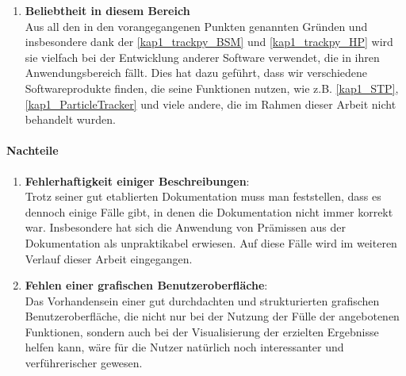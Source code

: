 \begin{enumerate}
    			\item \textbf{Beliebtheit in diesem Bereich}\\
    			Aus all den in den vorangegangenen Punkten genannten Gründen und insbesondere dank der \ref{kap1_trackpy_BSM} und \ref{kap1_trackpy_HP} wird sie vielfach bei der Entwicklung anderer Software verwendet, die in ihren Anwendungsbereich fällt. Dies hat dazu geführt, dass wir verschiedene Softwareprodukte finden, die seine Funktionen nutzen, wie z.B. \ref{kap1_STP}, \ref{kap1_ParticleTracker} und viele andere, die im Rahmen dieser Arbeit nicht behandelt wurden.
    			
		\end{enumerate}
		
	\paragraph{Nachteile}
		\begin{enumerate}
				\item \textbf{Fehlerhaftigkeit einiger Beschreibungen}:\\				
				Trotz seiner gut etablierten Dokumentation muss man feststellen, dass es dennoch einige Fälle gibt, in denen die Dokumentation nicht immer korrekt war. Insbesondere hat sich die Anwendung von Prämissen aus der Dokumentation als unpraktikabel erwiesen. Auf diese Fälle wird im weiteren Verlauf dieser Arbeit eingegangen.
				    			
    			\item \textbf{Fehlen einer grafischen Benutzeroberfläche}:\\
    			Das Vorhandensein einer gut durchdachten und strukturierten grafischen Benutzeroberfläche, die nicht nur bei der Nutzung der Fülle der angebotenen Funktionen, sondern auch bei der Visualisierung der erzielten Ergebnisse helfen kann, wäre für die Nutzer natürlich noch interessanter und verführerischer gewesen.
		\end{enumerate}
		
